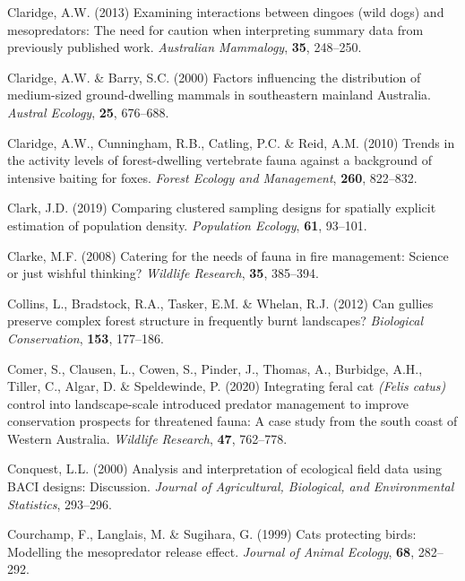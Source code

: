 \documentclass[11pt,a4paper,titlepage,twoside,openright]{style/unimelbthesis}
\begin{document}
\begin{mainmatter}
\leavevmode\hypertarget{ref-claridge2013examining}{}%
Claridge, A.W. (2013) Examining interactions between dingoes (wild dogs) and mesopredators: The need for caution when interpreting summary data from previously published work. \emph{Australian Mammalogy}, \textbf{35}, 248--250.

\leavevmode\hypertarget{ref-claridge2000factors}{}%
Claridge, A.W. \& Barry, S.C. (2000) Factors influencing the distribution of medium-sized ground-dwelling mammals in southeastern mainland Australia. \emph{Austral Ecology}, \textbf{25}, 676--688.

\leavevmode\hypertarget{ref-claridge2010trends}{}%
Claridge, A.W., Cunningham, R.B., Catling, P.C. \& Reid, A.M. (2010) Trends in the activity levels of forest-dwelling vertebrate fauna against a background of intensive baiting for foxes. \emph{Forest Ecology and Management}, \textbf{260}, 822--832.

\leavevmode\hypertarget{ref-clark2019comparing}{}%
Clark, J.D. (2019) Comparing clustered sampling designs for spatially explicit estimation of population density. \emph{Population Ecology}, \textbf{61}, 93--101.

\leavevmode\hypertarget{ref-clarke2008catering}{}%
Clarke, M.F. (2008) Catering for the needs of fauna in fire management: Science or just wishful thinking? \emph{Wildlife Research}, \textbf{35}, 385--394.

\leavevmode\hypertarget{ref-collins2012can}{}%
Collins, L., Bradstock, R.A., Tasker, E.M. \& Whelan, R.J. (2012) Can gullies preserve complex forest structure in frequently burnt landscapes? \emph{Biological Conservation}, \textbf{153}, 177--186.

\leavevmode\hypertarget{ref-comer2020integrating}{}%
Comer, S., Clausen, L., Cowen, S., Pinder, J., Thomas, A., Burbidge, A.H., Tiller, C., Algar, D. \& Speldewinde, P. (2020) Integrating feral cat \emph{(Felis catus)} control into landscape-scale introduced predator management to improve conservation prospects for threatened fauna: A case study from the south coast of Western Australia. \emph{Wildlife Research}, \textbf{47}, 762--778.

\leavevmode\hypertarget{ref-conquest2000analysis}{}%
Conquest, L.L. (2000) Analysis and interpretation of ecological field data using BACI designs: Discussion. \emph{Journal of Agricultural, Biological, and Environmental Statistics}, 293--296.

\leavevmode\hypertarget{ref-courchamp1999cats}{}%
Courchamp, F., Langlais, M. \& Sugihara, G. (1999) Cats protecting birds: Modelling the mesopredator release effect. \emph{Journal of Animal Ecology}, \textbf{68}, 282--292.


\end{mainmatter}
\end{document}
